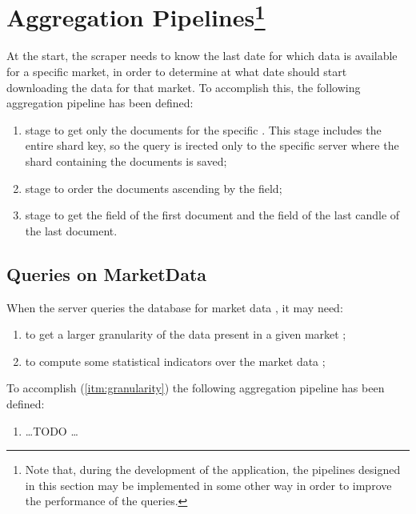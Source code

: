 \section[Aggregation Pipelines]{Aggregation Pipelines\footnote{Note that, during
the development of the application, the pipelines designed in this section may
be implemented in some other way  in order to improve the performance of the
queries.}}\label{sec:aggregations}

At the start, the scraper needs to know the last date for which data is
available for a specific market, in order to determine at what date should start
downloading the data for that market. To accomplish this, the following
aggregation pipeline has been defined:
\begin{enumerate}
	\item {} stage to get only the documents for the specific
		. This stage includes the entire shard key, so the
		query is irected only to the specific server where the shard
		containing the documents is saved;
	\item {} stage to order the documents ascending by the
		 field;
	\item {} stage to get the  field of the first
		document and the  field of the last candle of
		the last document.
\end{enumerate}

\subsection{Queries on MarketData}

When the server queries the database for market data , it may need:
\begin{enumerate}
	\item\label{itm:granularity} to get a larger granularity of the data
		present in a given market ;
	\item\label{itm:indicators} to compute some statistical indicators over
		the market data ;
\end{enumerate}

To accomplish (\ref{itm:granularity}) the following aggregation pipeline has
been defined:
\begin{enumerate}
	\item \ldots TODO \ldots
\end{enumerate}

